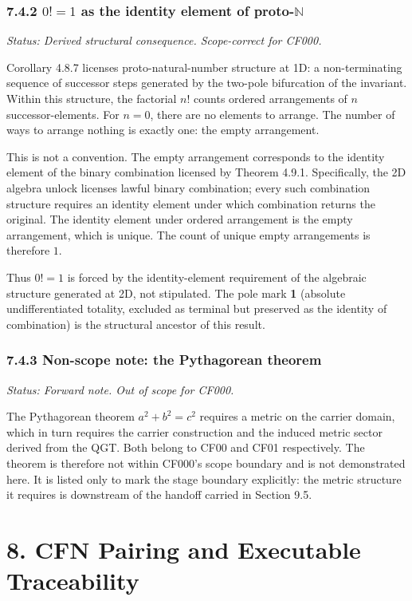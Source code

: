 \documentclass[11pt]{article}
\begin{document}
\subsubsection*{7.4.2 $0! = 1$ as the identity element of proto-$\mathbb{N}$}

\textit{Status: Derived structural consequence. Scope-correct for CF000.}

Corollary 4.8.7 licenses proto-natural-number structure at 1D: a non-terminating
sequence of successor steps generated by the two-pole bifurcation of the invariant.
Within this structure, the factorial $n!$ counts ordered arrangements of $n$
successor-elements. For $n = 0$, there are no elements to arrange. The number of
ways to arrange nothing is exactly one: the empty arrangement.

This is not a convention. The empty arrangement corresponds to the identity element
of the binary combination licensed by Theorem 4.9.1. Specifically, the 2D algebra
unlock licenses lawful binary combination; every such combination structure requires
an identity element under which combination returns the original. The identity
element under ordered arrangement is the empty arrangement, which is unique. The
count of unique empty arrangements is therefore $1$.

Thus $0! = 1$ is forced by the identity-element requirement of the algebraic
structure generated at 2D, not stipulated. The pole mark \textbf{1} (absolute
undifferentiated totality, excluded as terminal but preserved as the identity of
combination) is the structural ancestor of this result.

\subsubsection*{7.4.3 Non-scope note: the Pythagorean theorem}

\textit{Status: Forward note. Out of scope for CF000.}

The Pythagorean theorem $a^2 + b^2 = c^2$ requires a metric on the carrier domain,
which in turn requires the carrier construction and the induced metric sector derived
from the QGT. Both belong to CF00 and CF01 respectively. The theorem is therefore
not within CF000's scope boundary and is not demonstrated here. It is listed only to
mark the stage boundary explicitly: the metric structure it requires is downstream
of the handoff carried in Section 9.5.

\section{8. CFN Pairing and Executable Traceability}\label{cfn-pairing-and-executable-traceability}
\end{document}

